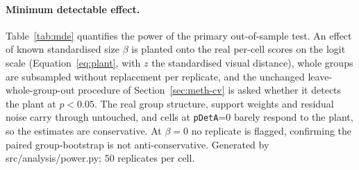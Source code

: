 \paragraph{Minimum detectable effect.} Table~\ref{tab:mde} quantifies the power of the primary
out-of-sample test. An effect of known standardised size $\beta$ is planted onto the real per-cell scores on
the logit scale (Equation~\ref{eq:plant}, with $z$ the standardised visual distance), whole groups are
subsampled without replacement per replicate, and the unchanged
leave-whole-group-out procedure of Section~\ref{sec:meth-cv} is asked whether it detects the plant at
$p<0.05$. The real group structure, support weights and residual noise carry through untouched, and cells at
\texttt{pDetA}=0 barely respond to the plant, so the estimates are conservative. At $\beta=0$ no replicate
is flagged, confirming the paired group-bootstrap is not anti-conservative. Generated by
src/analysis/power.py; $50$ replicates per cell.

